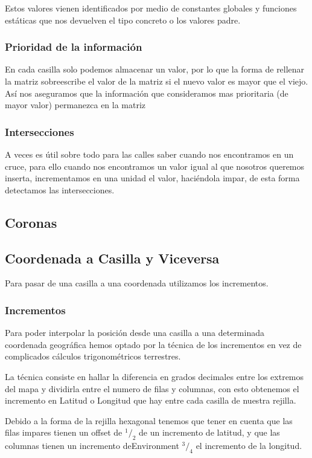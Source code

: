 Estos valores vienen identificados por medio de constantes globales y funciones
estáticas que nos devuelven el tipo concreto o los valores padre.
\subsubsection*{Prioridad de la información}
En cada casilla solo podemos almacenar un valor, por lo que la forma de
rellenar la matriz sobreescribe el valor de la matriz si el nuevo valor es
mayor que el viejo. Así nos aseguramos que la información que consideramos mas
prioritaria (de mayor valor) permanezca en la matriz
\subsubsection*{Intersecciones}
A veces es útil sobre todo para las calles saber cuando nos encontramos en un
cruce, para ello cuando nos encontramos un valor igual al que nosotros queremos
inserta, incrementamos en una unidad el valor, haciéndola impar, de esta forma
detectamos las intersecciones.
\subsection*{Coronas} %
\subsection*{Coordenada a Casilla y Viceversa} \label{coordToCasilla}
Para pasar de una casilla a una coordenada utilizamos los incrementos.

\subsubsection*{Incrementos} \label{incrementos}
Para poder interpolar la posición desde una casilla a una determinada
coordenada geográfica hemos optado por la técnica de los incrementos en vez de
complicados cálculos trigonométricos terrestres.

La técnica consiste en hallar la diferencia en grados decimales entre los
extremos del mapa y dividirla entre el numero de filas y columnas, con esto
obtenemos el incremento en Latitud o Longitud que hay entre cada casilla de
nuestra rejilla.

Debido a la forma de la rejilla hexagonal tenemos que tener en cuenta que las
filas impares tienen un offset de \begin{math} ^1/_2 \end{math} de un incremento
de latitud, y que las columnas tienen un incremento deEnvironment
\begin{math} ^3/_4 \end{math} el incremento de la longitud.

